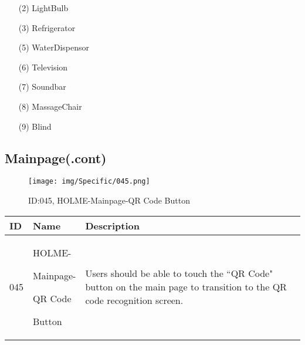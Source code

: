\documentclass[conference]{IEEEtran}
\begin{document}
\begin{enumerate}
\begin{itemize}
\item [(2)] LightBulb\cite{LightBulb}\\
\item [(3)] Refrigerator\cite{Refrigerator}\\
\item [(5)] WaterDispensor\cite{WaterDispensor}\\
\item [(6)] Television\cite{Television}\\
\item [(7)] Soundbar\cite{Soundbar}\\
\item [(8)] MassageChair\cite{MassageChair}\\
\item [(9)] Blind\cite{Blind}\\
\end{itemize}

\clearpage

\subsection{Mainpage(.cont)}
\begin{figure}[h]
\centering
\texttt{[image: img/Specific/045.png]}
\caption{ID:045, HOLME-Mainpage-QR Code Button}
\end{figure}
\begin{table}[h]
\def\arraystretch{1.2} \small
    \begin{tabular}{|p{1cm}|p{1.8cm}|p{5.0cm}|}
        \hline
        ID & Name & Description\\ \hline
         045 \par  & HOLME-\par Mainpage-\par QR Code \par Button &Users should be able to touch the ``QR Code" button on the main page to transition to the QR code recognition screen.\\ \hline
    \end{tabular}
\end{table}

\vspace{1cm}


\end{enumerate}
\end{document}
